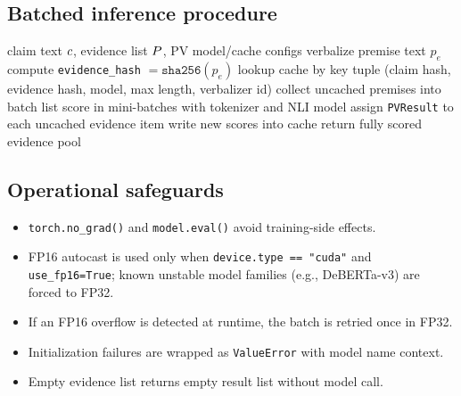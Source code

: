 \subsection{Batched inference procedure}
\begin{algorithm}[H]
\caption{PV scoring with cache-aware batched inference}
\begin{algorithmic}[1]
\Require claim text $c$, evidence list $P$, PV model/cache configs
  \State verbalize premise text $p_e$
  \State compute \texttt{evidence\_hash} $=\texttt{sha256}(p_e)$
  \State lookup cache by key tuple (claim hash, evidence hash, model, max length, verbalizer id)
\EndFor
\State collect uncached premises into batch list
  \State score in mini-batches with tokenizer and NLI model
  \State assign \texttt{PVResult} to each uncached evidence item
  \State write new scores into cache
\EndIf
\State return fully scored evidence pool
\end{algorithmic}
\end{algorithm}

\subsection{Operational safeguards}
\begin{itemize}
\item \texttt{torch.no\_grad()} and \texttt{model.eval()} avoid training-side effects.
\item FP16 autocast is used only when \texttt{device.type == "cuda"} and \texttt{use\_fp16=True}; known unstable model families (e.g., DeBERTa-v3) are forced to FP32.
\item If an FP16 overflow is detected at runtime, the batch is retried once in FP32.
\item Initialization failures are wrapped as \texttt{ValueError} with model name context.
\item Empty evidence list returns empty result list without model call.
\end{itemize}

